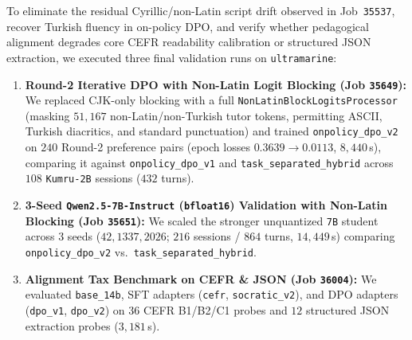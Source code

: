 \documentclass[a4paper,12pt]{report}
\begin{document}
To eliminate the residual Cyrillic/non-Latin script drift observed in Job~\texttt{35537}, recover Turkish fluency in on-policy DPO, and verify whether pedagogical alignment degrades core CEFR readability calibration or structured JSON extraction, we executed three final validation runs on \texttt{ultramarine}:
\begin{enumerate}
    \item \textbf{Round-2 Iterative DPO with Non-Latin Logit Blocking (Job \texttt{35649}):} We replaced CJK-only blocking with a full \texttt{NonLatinBlockLogitsProcessor} (masking $51{,}167$ non-Latin/non-Turkish tutor tokens, permitting ASCII, Turkish diacritics, and standard punctuation) and trained \texttt{onpolicy\_dpo\_v2} on $240$ Round-2 preference pairs (epoch losses $0.3639 \to 0.0113$, $8{,}440$\,s), comparing it against \texttt{onpolicy\_dpo\_v1} and \texttt{task\_separated\_hybrid} across $108$ \texttt{Kumru-2B} sessions ($432$ turns).
    \item \textbf{3-Seed \texttt{Qwen2.5-7B-Instruct} (\texttt{bfloat16}) Validation with Non-Latin Blocking (Job \texttt{35651}):} We scaled the stronger unquantized \texttt{7B} student across $3$ seeds ($42, 1337, 2026$; $216$ sessions / $864$ turns, $14{,}449$\,s) comparing \texttt{onpolicy\_dpo\_v2} vs.\ \texttt{task\_separated\_hybrid}.
    \item \textbf{Alignment Tax Benchmark on CEFR \& JSON (Job \texttt{36004}):} We evaluated \texttt{base\_14b}, SFT adapters (\texttt{cefr}, \texttt{socratic\_v2}), and DPO adapters (\texttt{dpo\_v1}, \texttt{dpo\_v2}) on $36$ CEFR B1/B2/C1 probes and $12$ structured JSON extraction probes ($3{,}181$\,s).
\end{enumerate}
\end{document}
